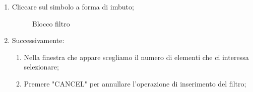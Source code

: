 \begin{enumerate}
	\item Cliccare sul simbolo a forma di imbuto;
	\begin{figure}[!ht]
		\centering
		\caption{Blocco filtro}
	\end{figure}
	\newpage
	\item Successivamente:
	\begin{enumerate}
		\item Nella finestra che appare scegliamo il numero di elementi che ci interessa selezionare;
		\item Premere "CANCEL" per annullare l'operazione di inserimento del filtro;

\end{enumerate}
\end{enumerate}
